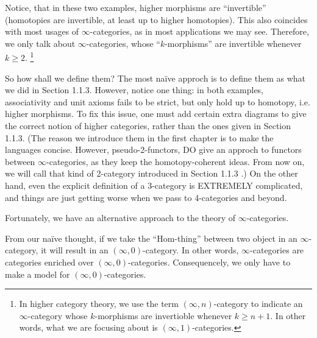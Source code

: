 
Notice, that in these two examples, higher morphisms are ``invertible'' (homotopies are invertible, at least up to higher homotopies).
This also coincides with most usages of $\infty$-categories, as in most applications we may see. Therefore, we only talk about
$\infty$-categories, whose ``$k$-morphisms'' are invertible whenever $k\ge 2$. \footnote{In higher category theory, we use 
the term $(\infty,n)$-category to indicate an $\infty$-category whose $k$-morphisms are invertioble whenever $k\ge n+1$. In other words,
what we are focusing about is $(\infty,1)$-categories.}

So how shall we define them? The most na\"ive approch is to define them as what we did in Section 1.1.3. However, notice one thing: 
in both examples, associativity and unit axioms fails to be strict, but only hold up to homotopy, i.e. higher morphisms. To fix this issue,
one must add certain extra diagrams to give the correct notion of higher categories, rather than the ones given in Section 1.1.3.
(The reason we introduce them in the first chapter is to make the languages concise. However, pseudo-2-functors, DO give an approch to
functors between $\infty$-categories, as they keep the homotopy-coherent ideas. From now on, we will call that kind of 2-category
introduced in Section 1.1.3 .) On the other hand, even the explicit definition of a 3-category 
is EXTREMELY complicated, and things are just getting worse when we pass to 4-categories and beyond.

Fortunately, we have an alternative approach to the theory of $\infty$-categories.

From our na\"ive thought, if we take the ``Hom-thing'' between two object in an $\infty$-category, it will result in an $(\infty,0)$-category.
In other words, $\infty$-categories are categories enriched over $(\infty,0)$-categories. Consequencely, we only have to make a model for
$(\infty,0)$-categories.

